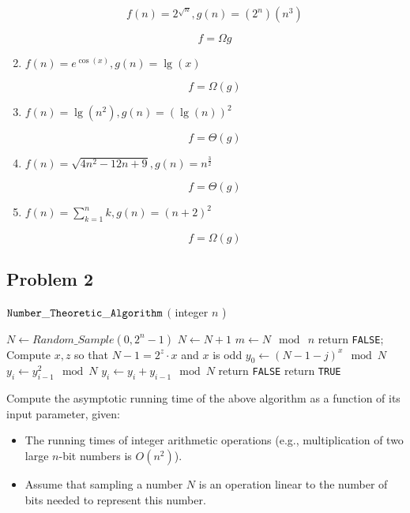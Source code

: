 \documentclass[11pt]{article}
\begin{document}
\begin{enumerate}
		\[ f(n) = 2^{\sqrt{n}}, g(n) = (2^n) (n^3) \]
		
		\[f = \Omega{g}\]
	
	\item $f(n) = e^{\cos(x)}, g(n) = \lg(x)$
	
		\[ f = \Omega(g) \]
	
	\item $ f(n) = \lg(n^2), g(n) = (\lg(n))^2 $
	
		\[ f = \Theta(g) \]
	
	\item $ f(n) = \sqrt{4n^2 - 12n + 9}, g(n) = n^{\frac{3}{2}} $
	
		\[ f = \Theta(g) \]
	
	\item $ f(n) = \sum_{k = 1}^{n} k, g(n) = (n + 2)^2 $
	
		\[ f = \Omega(g) \]

\end{enumerate}

\subsection*{Problem 2}

\begin{algorithm}[h]
\caption{${\tt Number\_Theoretic\_Algorithm}$ $($ integer $n$ ) }
\label{algo}
$N \leftarrow Random\_Sample( 0, 2^n-1)$\; 
{
  $N \leftarrow N + 1$  \; 
}
$m \leftarrow N \mod\ n$  \; 
{
  {
    return {\tt FALSE}; 
  }
  Compute $x,z$ so that $N - 1 = 2^z \cdot x$ and $x$ is odd\;
  $y_0 \leftarrow (N-1-j)^x \mod N$\;
  {
    $y_i \leftarrow y_{i-1}^2 \mod N$ \;
    $y_i \leftarrow y_i + y_{i-1} \mod N$\;
  }
  {
    return {\tt FALSE}  \;
  }
}
return {\tt TRUE}\;
\end{algorithm}

Compute the asymptotic running time of the
above algorithm as a function of its input parameter, given:

\begin{itemize}
\item The running times of integer arithmetic operations (e.g.,
  multiplication of two large $n$-bit numbers is $O(n^2)$).
\item Assume that sampling a number $N$ is an operation linear to the
  number of bits needed to represent this number.
\end{itemize}
\end{document}
